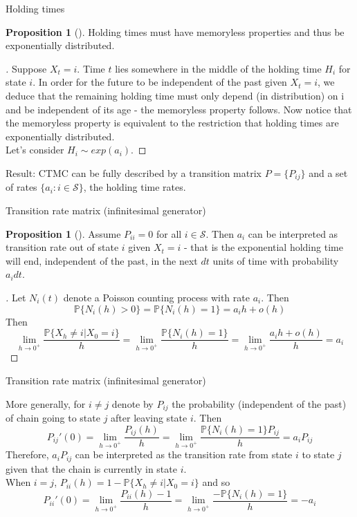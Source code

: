 \documentclass{beamer}%
\theoremstyle{definition}
\newtheorem{proposition}[theorem]{Proposition}
\renewcommand{\P}{\mathbb{P}}
\begin{document}
\begin{frame}{Holding times}

\begin{proposition}[]
Holding times must have memoryless properties and thus be exponentially distributed.
\end{proposition}
\begin{proof}[]
Suppose $X_t=i$. Time $t$ lies somewhere in the middle of the holding time $H_i$ for state $i$. In order for the future to be independent of the past given $X_t = i$, we deduce that
the remaining holding time must only depend (in distribution) on i and be independent of its age - the memoryless property follows. Now notice that the memoryless property is equivalent to the restriction that holding times are exponentially distributed.
\\
Let's consider $H_i\sim exp(a_i)$.
\end{proof}
Result: CTMC can be fully described by a transition matrix $P=\{P_{ij}\}$ and a set of rates $\{a_i: i\in\mathcal{S}\}$, the holding time rates.

\end{frame}


\begin{frame}{Transition rate matrix (infinitesimal generator)}

\begin{proposition}[]
Assume $P_{ii}=0$ for all $i\in\mathcal{S}$. Then $a_i$ can be interpreted as transition rate out of state $i$ given $X_t=i$ - that is the exponential holding time will end, independent of the past, in the next $dt$ units of time with probability $a_idt$.
\end{proposition}
\begin{proof}[]
Let $N_i(t)$ denote a Poisson counting process with rate $a_i$. Then
$$\P\{N_i(h)>0\}=\P\{N_i(h)=1\}=a_ih+o(h)$$
Then
$$\lim\limits_{h\to0^+}\frac{\P\{X_h\neq i|X_0=i\}}{h}=\lim\limits_{h\to0^+}\frac{\P\{N_i(h)=1\}}{h}=\lim\limits_{h\to0^+}\frac{a_ih+o(h)}{h}=a_i$$
\end{proof}

\end{frame}


\begin{frame}{Transition rate matrix (infinitesimal generator)}

More generally, for $i\neq j$ denote by $P_{ij}$ the probability (independent of the past) of chain going to state $j$ after leaving state $i$. Then
$$P_{ij}'(0)=\lim\limits_{h\to0^+}\frac{P_{ij}(h)}{h}=\lim\limits_{h\to0^+}\frac{\P\{N_i(h)=1\}P_{ij}}{h}=a_iP_{ij}$$
Therefore, $a_iP_{ij}$ can be interpreted as the transition rate from state $i$ to state $j$ given that the chain is currently in state $i$.
\\
When $i=j$, $P_{ii}(h)=1-\P\{X_h\neq i|X_0=i\}$ and so
$$P_{ii}'(0)=\lim\limits_{h\to0^+}\frac{P_{ii}(h) - 1}{h}=\lim\limits_{h\to0^+}\frac{-\P\{N_i(h)=1\}}{h}=-a_i$$

\end{frame}
\end{document}
